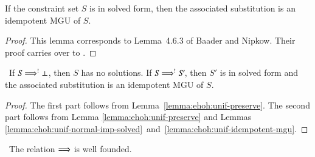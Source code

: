   \begin{lemma}\label{lemma:ehoh:unif-idempotent-mgu}
    If the constraint set $\mathit{S}$ is in solved form, then the associated
    substitution is an idempotent MGU of $\mathit{S}.$
  \end{lemma}
  \begin{proof}
    This lemma corresponds to Lemma~4.6.3 of Baader and Nipkow. Their proof
    carries over to \lfhol{}.
  \end{proof}

  \begin{theorem}\label{thm:ehoh:unif-partial-correctness}\,%
    If $\mathit{S} \Longrightarrow^{!} \bot$, then $\mathit{S}$ has no solutions.
    If $\mathit{S} \Longrightarrow^{!} \mathit{S}'\!$, then $\mathit{S}'$ is in solved form and the
    associated substitution is an idempotent MGU of $\mathit{S}$.
    \end{theorem}

    \begin{proof}
    The first part follows from Lemma~\ref{lemma:ehoh:unif-preserve}.
    The second part follows from Lemma \ref{lemma:ehoh:unif-preserve}
    and Lemmas
    \ref{lemma:ehoh:unif-normal-imp-solved}~and~\ref{lemma:ehoh:unif-idempotent-mgu}.
    \end{proof}

      \newpage
      \begin{theorem}[Termination]\label{thm:ehoh:unif-termination}\,%
      The relation $\Longrightarrow$ is well founded.
      \end{theorem}
    
